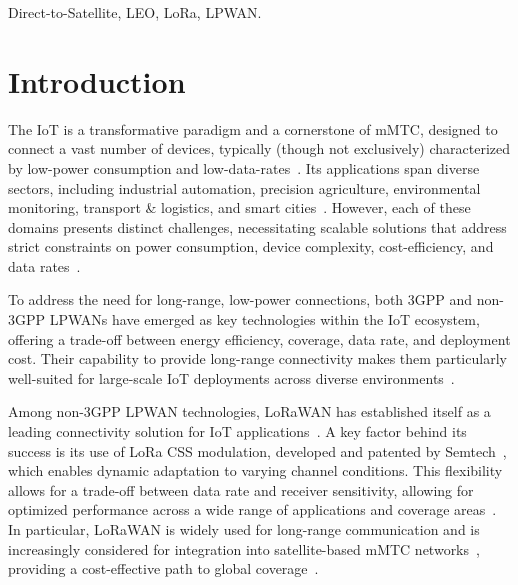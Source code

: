 \documentclass{IEEEtran}
\begin{document}
\begin{IEEEkeywords}
Direct-to-Satellite, LEO, LoRa, LPWAN.
\end{IEEEkeywords}

\section{Introduction} \label{sec:introduction}

The \acf{IoT} is a transformative paradigm and a cornerstone of \ac{mMTC}, designed to connect a vast number of devices, typically (though not exclusively) characterized by low-power consumption and low-data-rates~\cite{Milarokostas.2023}. Its applications span diverse sectors, including industrial automation, precision agriculture, environmental monitoring, transport \& logistics, and smart cities~\cite{Arun.2024, Guo.2024}. However, each of these domains presents distinct challenges, necessitating scalable solutions that address strict constraints on power consumption, device complexity, cost-efficiency, and data rates~\cite{6g_flagship, Jouhari.2023}.

To address the need for long-range, low-power connections, both 3GPP and non-3GPP \acfp{LPWAN} have emerged as key technologies within the \ac{IoT} ecosystem, offering a trade-off between energy efficiency, coverage, data rate, and deployment cost. Their capability to provide long-range connectivity makes them particularly well-suited for large-scale \ac{IoT} deployments across diverse environments~\cite{Qin.2019, Jiang.2022, Fraire.2022, Azim.2024}.

Among non-3GPP \ac{LPWAN} technologies, \ac{LoRaWAN} has established itself as a leading connectivity solution for \ac{IoT} applications~\cite{Shanmuga.2020, Jiang.2022}. A key factor behind its success is its use of \acf{LoRa} \ac{CSS} modulation, developed and patented by Semtech~\cite{Semtech}, which enables dynamic adaptation to varying channel conditions. This flexibility allows for a trade-off between data rate and receiver sensitivity, allowing for optimized performance across a wide range of applications and coverage areas~\cite{Pasolini.2022}. In particular, \ac{LoRaWAN} is widely used for long-range communication and is increasingly considered for integration into satellite-based \ac{mMTC} networks~\cite{Doroshkin.2019}, providing a cost-effective path to global coverage~\cite{6g_flagship}.
\end{document}
